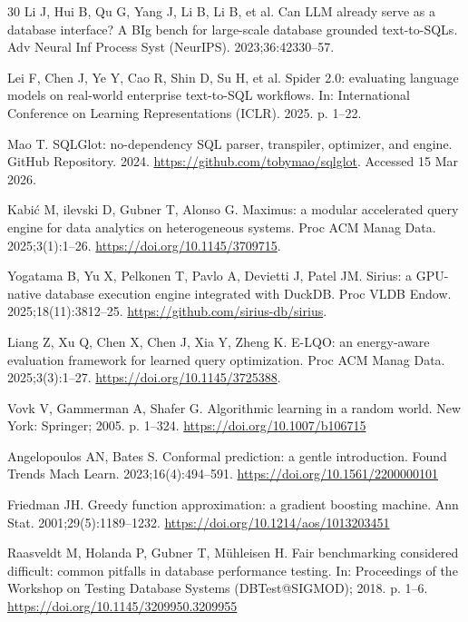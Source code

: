 \documentclass[10pt,a4paper]{article}
\begin{document}
{\begin{thebibliography}{30}
Li J, Hui B, Qu G, Yang J, Li B, Li B, et al. Can LLM already serve as a database interface? A BIg bench for large-scale database grounded text-to-SQLs. Adv Neural Inf Process Syst (NeurIPS). 2023;36:42330--57.

Lei F, Chen J, Ye Y, Cao R, Shin D, Su H, et al. Spider 2.0: evaluating language models on real-world enterprise text-to-SQL workflows. In: International Conference on Learning Representations (ICLR). 2025. p. 1--22.

Mao T. SQLGlot: no-dependency SQL parser, transpiler, optimizer, and engine. GitHub Repository. 2024. \url{https://github.com/tobymao/sqlglot}. Accessed 15 Mar 2026.

Kabi{\'c} M, \DJ ilevski D, Gubner T, Alonso G. Maximus: a modular accelerated query engine for data analytics on heterogeneous systems. Proc ACM Manag Data. 2025;3(1):1--26. \url{https://doi.org/10.1145/3709715}.

Yogatama B, Yu X, Pelkonen T, Pavlo A, Devietti J, Patel JM. Sirius: a GPU-native database execution engine integrated with DuckDB. Proc VLDB Endow. 2025;18(11):3812--25. \url{https://github.com/sirius-db/sirius}.

Liang Z, Xu Q, Chen X, Chen J, Xia Y, Zheng K. E-LQO: an energy-aware evaluation framework for learned query optimization. Proc ACM Manag Data. 2025;3(3):1--27. \url{https://doi.org/10.1145/3725388}.

Vovk V, Gammerman A, Shafer G. Algorithmic learning in a random world. New York: Springer; 2005. p. 1--324. \url{https://doi.org/10.1007/b106715}

Angelopoulos AN, Bates S. Conformal prediction: a gentle introduction. Found Trends Mach Learn. 2023;16(4):494--591. \url{https://doi.org/10.1561/2200000101}

Friedman JH. Greedy function approximation: a gradient boosting machine. Ann Stat. 2001;29(5):1189--1232. \url{https://doi.org/10.1214/aos/1013203451}

Raasveldt M, Holanda P, Gubner T, M{\"u}hleisen H. Fair benchmarking considered difficult: common pitfalls in database performance testing. In: Proceedings of the Workshop on Testing Database Systems (DBTest@SIGMOD); 2018. p. 1--6. \url{https://doi.org/10.1145/3209950.3209955}


\end{thebibliography}}
\end{document}
